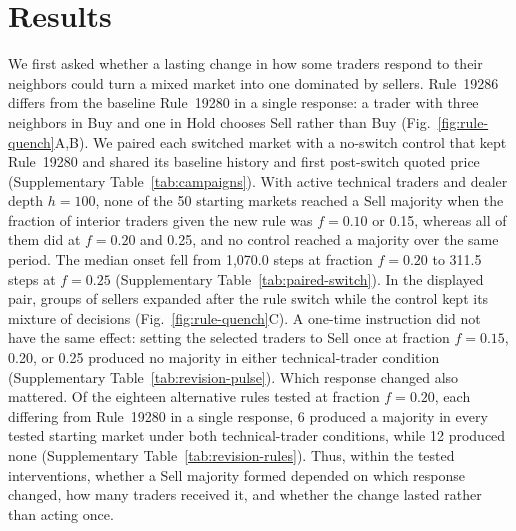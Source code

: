 \section{Results}

We first asked whether a lasting change in how some traders respond to
their neighbors could turn a mixed market into one dominated by sellers.
Rule~19286 differs from the baseline Rule~19280 in a single response:
a trader with three neighbors in Buy and one in Hold chooses Sell rather
than Buy (Fig.~\ref{fig:rule-quench}A,B). We paired each switched market
with a no-switch control that kept Rule~19280 and shared its baseline
history and first post-switch quoted price (Supplementary
Table~\ref{tab:campaigns}). With active technical traders and dealer
depth $h=100$, none of the 50 starting markets reached a Sell majority
when the fraction of interior traders given the new rule was $f=0.10$ or
0.15, whereas all of them did at $f=0.20$ and 0.25, and no control
reached a majority over the same period. The median onset fell from
1,070.0 steps at fraction $f=0.20$ to 311.5 steps at $f=0.25$
(Supplementary Table~\ref{tab:paired-switch}). In the displayed pair,
groups of sellers expanded after the rule switch while the control kept
its mixture of decisions (Fig.~\ref{fig:rule-quench}C). A one-time
instruction did not have the same effect: setting the selected traders
to Sell once at fraction $f=0.15$, 0.20, or 0.25 produced no majority in either technical-trader condition
(Supplementary Table~\ref{tab:revision-pulse}). Which response changed
also mattered. Of the eighteen alternative rules tested at fraction
$f=0.20$, each differing from Rule~19280 in a single response,
6 produced a majority in every tested starting market under both technical-trader conditions, while 12 produced none (Supplementary Table~\ref{tab:revision-rules}). Thus,
within the tested interventions, whether a Sell majority formed
depended on which response changed, how many traders received it, and
whether the change lasted rather than acting once.

